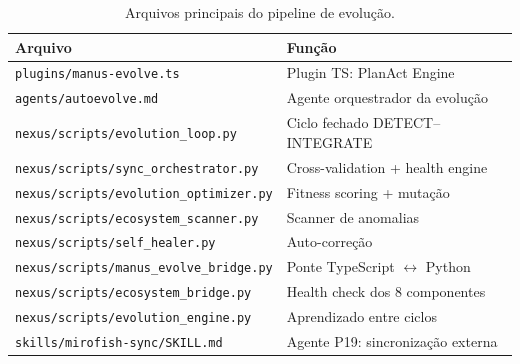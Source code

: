 \documentclass[
  article,
  12pt,
  oneside,
  a4paper,
  brazil,
  sumario=tradicional
]{abntex2}
\begin{document}
\begin{apendicesenv}
\begin{table}[H]
  \centering
  \caption{Arquivos principais do pipeline de evolução.}
  \begin{tabular}{|l|l|}
    \hline
    \textbf{Arquivo} & \textbf{Função} \\
    \hline
    \texttt{plugins/manus-evolve.ts} & Plugin TS: PlanAct Engine \\
    \texttt{agents/autoevolve.md} & Agente orquestrador da evolução \\
    \texttt{nexus/scripts/evolution\_loop.py} & Ciclo fechado DETECT--INTEGRATE \\
    \texttt{nexus/scripts/sync\_orchestrator.py} & Cross-validation + health engine \\
    \texttt{nexus/scripts/evolution\_optimizer.py} & Fitness scoring + mutação \\
    \texttt{nexus/scripts/ecosystem\_scanner.py} & Scanner de anomalias \\
    \texttt{nexus/scripts/self\_healer.py} & Auto-correção \\
    \texttt{nexus/scripts/manus\_evolve\_bridge.py} & Ponte TypeScript $\leftrightarrow$ Python \\
    \texttt{nexus/scripts/ecosystem\_bridge.py} & Health check dos 8 componentes \\
    \texttt{nexus/scripts/evolution\_engine.py} & Aprendizado entre ciclos \\
    \texttt{skills/mirofish-sync/SKILL.md} & Agente P19: sincronização externa \\
    \hline
  \end{tabular}
\end{table}

\end{apendicesenv}
\end{document}
